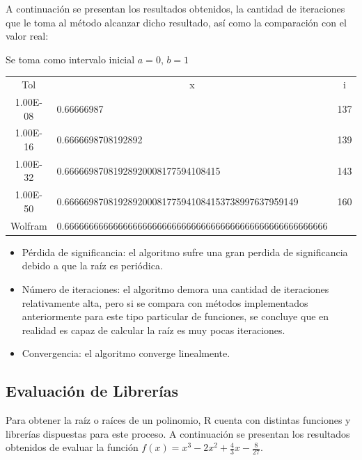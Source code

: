 \documentclass[a4paper,12pt]{article}
\begin{document}
A continuación se presentan los resultados obtenidos, la cantidad de iteraciones que le toma al método alcanzar dicho resultado, así como la comparación con el valor real: \par

Se toma como intervalo inicial $a = 0$, $b = 1$ \par


\begin{table}[ht!]
\begin{tabular}{clc}
Tol      & \multicolumn{1}{c}{x}                                    & i   \\
1.00E-08 & 0.66666987                                               & 137 \\
1.00E-16 & 0.6666698708192892                                       & 139 \\
1.00E-32 & 0.66666987081928920008177594108415                       & 143 \\
1.00E-50 & 0.666669870819289200081775941084153738997637959149       & 160 \\
Wolfram  & 0.666666666666666666666666666666666666666666666666666666 &    
\end{tabular}
\end{table}

\vspace{-1em}
\begin{itemize}
    \item Pérdida de significancia: el algoritmo sufre una gran perdida de significancia debido a que la raíz es periódica.
    \vspace{-10pt}
    \item Número de iteraciones: el algoritmo demora una cantidad de iteraciones relativamente alta, pero si se compara con métodos implementados anteriormente para este tipo particular de funciones, se concluye que en realidad es capaz de calcular la raíz es muy pocas iteraciones.
    \vspace{-10pt}
    \item Convergencia: el algoritmo converge linealmente.
\end{itemize}

\newpage

\subsection{Evaluación de Librerías}

Para obtener la raíz o raíces de un polinomio, R cuenta con distintas funciones y librerías dispuestas para este proceso. A continuación se presentan los resultados obtenidos de evaluar la función $f(x)=x^3-2x^2+\frac{4}{3}x-\frac{8}{27}$. \par 
\end{document}

